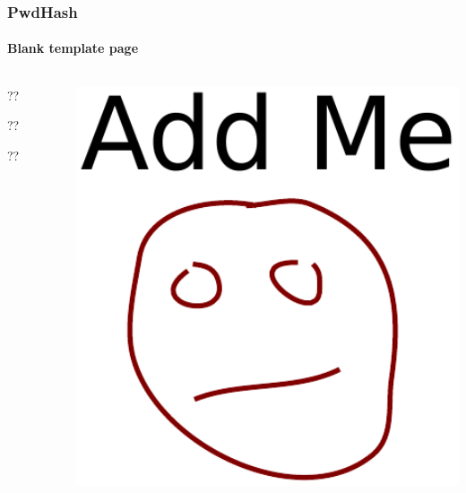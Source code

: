 \documentclass[handout, notes=hide]{beamer}
\begin{document}
\begin{frame}
\frametitle{PwdHash}
\framesubtitle{Blank template page}
\setlength{\parskip}{0.5em}

\begin{columns}[T]
\begin{column}[T]{0.6\textwidth}
\setlength{\parskip}{0.5em}
??

??

??
\end{column}
\begin{column}[T]{0.4\textwidth}
\vspace{0.0em}
\includegraphics[width=1.0\textwidth]{addme}
\end{column}
\end{columns}


\end{frame}









\end{document}
